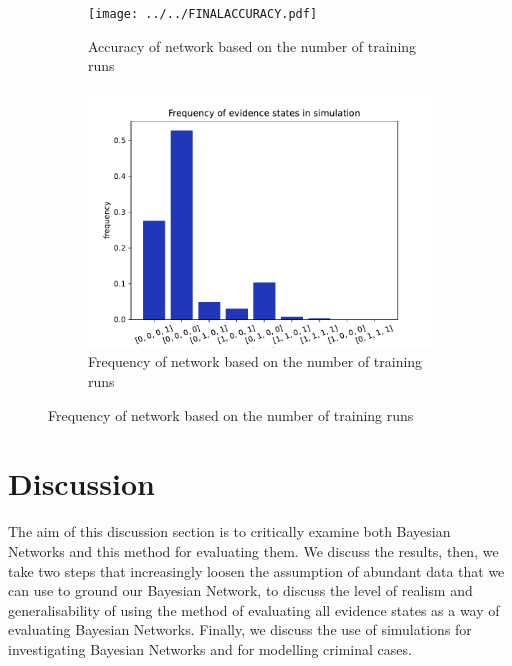\documentclass[12pt]{article}
\begin{document}
\begin{figure}[htbp]
\begin{center}
\begin{subfigure}{0.49\textwidth}
\texttt{[image: ../../FINALACCURACY.pdf]}
\caption{Accuracy of network based on the number of training runs}
\label{girl}
\end{subfigure}
\begin{subfigure}{0.49\textwidth}
\includegraphics[width=\linewidth]{GroteMarktPrivate/plots/freqStates.pdf}
\caption{Frequency of network based on the number of training runs}
\label{boy}
\end{subfigure}
\end{center}
\end{figure}




\newpage



\section{Discussion}
The aim of this discussion section is to critically examine both Bayesian Networks and this method for evaluating them. We discuss the results, then, we take two steps that increasingly loosen the assumption of abundant data that we can use to ground our Bayesian Network, to discuss the level of realism and generalisability of using the method of evaluating all evidence states as a way of evaluating Bayesian Networks. Finally, we discuss the use of simulations for investigating Bayesian Networks and for modelling criminal cases.
\end{document}
